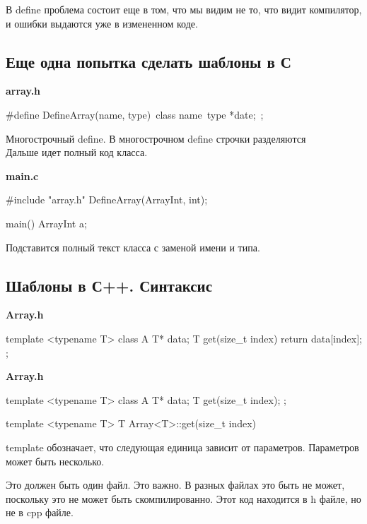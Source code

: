 В define  проблема состоит еще в том, что мы видим не то, что видит компилятор, и ошибки выдаются уже в измененном коде.

\subsection{Еще одна попытка сделать шаблоны в С} 

{\bf array.h}

\begin{cppcode}
\#define DefineArray(name, type)\
class name{\
   type *date;\
};
\end{cppcode}

Многострочный define. В многострочном define строчки разделяются \\

Дальше идет полный код класса. 

{\bf main.c}

\begin{cppcode}
#include "array.h"
DefineArray(ArrayInt, int);

main() {
    ArrayInt a;
}
\end{cppcode}

Подставится полный текст класса с заменой имени и типа. 

\subsection{Шаблоны в С++. Синтаксис}
         
{\bf Array.h}
\begin{cppcode}
template <typename T>
class A {
    T* data;
    T get(size_t index) {
        return data[index];
    }
};
\end{cppcode}

{\bf Array.h}

\begin{cppcode}
template <typename T>
class A {
    T* data;
    T get(size_t index);
};

template <typename T>
T Array<T>::get(size_t index) {

}
\end{cppcode}

template обозначает, что следующая единица зависит от параметров. Параметров может быть несколько. 

Это должен быть один файл. Это важно. В разных файлах это быть не может, поскольку это не может быть скомпилированно. Этот код находится в h файле, но не в cpp файле.

